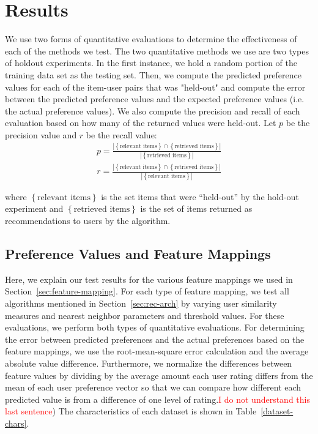 \documentclass{article}
\begin{document}
\section{Results}\label{sec:results}

We use two forms of quantitative evaluations to determine the effectiveness of each of the methods we test.
The two quantitative methods we use are two types of holdout experiments.
In the first instance, we hold a random portion of the training data set as the testing set. Then, we compute the 
predicted preference values for each of the item-user pairs that was "held-out" and compute the error between
the predicted preference values and the expected preference values (i.e. the actual preference values). We
also compute the precision and recall of each evaluation based on how many of the returned values
were held-out. Let $p$ be the precision value and $r$ be the recall value:\begin{align*}
p = \frac{|\left\{ \text{relevant items} \right\} \cap \left\{\text{retrieved items}\right\}|}{|\left\{\text{retrieved items}\right\}|}
\end{align*}
\begin{align*}
r = \frac{|\left\{ \text{relevant items} \right\} \cap \left\{\text{retrieved items}\right\}|}{|\left\{\text{relevant items}\right\}|}
\end{align*} 

where $\left\{\text{relevant items}\right\}$ is the set items that were ``held-out'' by the hold-out experiment and $\left\{\text{retrieved items}\right\}$ is the set of items returned as recommendations to users by the algorithm.

\subsection{Preference Values and Feature Mappings}

Here, we explain our test results for the various feature mappings we used in Section~\ref{sec:feature-mapping}. 
For each type of feature mapping, we test all algorithms mentioned in Section~\ref{sec:rec-arch} by varying user
similarity measures and nearest neighbor parameters and threshold values. For these evaluations, 
we perform both types of quantitative evaluations. For determining the error between predicted preferences and 
the actual preferences based on the feature mappings, we use the root-mean-square error calculation and the average
absolute value difference. Furthermore, we normalize the differences between feature values by dividing by the average
amount each user rating differs from the mean of each user preference vector so that we can compare
how different each predicted value is from a difference of one level of rating.\textcolor{red}{I do not understand this last sentence}) The characteristics of each dataset is
shown in Table~\ref{dataset-chars}.
\end{document}

